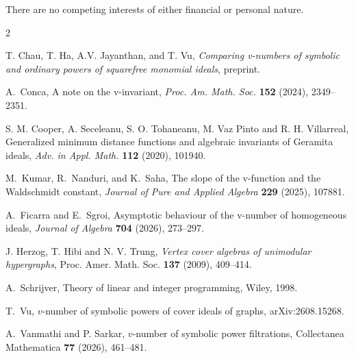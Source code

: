 \documentclass[12pt,amscd]{amsart}
\theoremstyle{definition}
\numberwithin{equation}{section}
\begin{document}
 There are no competing interests of either financial or personal nature.

\begin{thebibliography}{2}





 T. Chau, T. Ha, A.V. Jayanthan, and T. Vu, {\it Comparing v-numbers of symbolic and ordinary powers of squarefree monomial ideals},  preprint.

A.~Conca,
A note on the v-invariant, {\em Proc. Am. Math. Soc.} {\bf 152} (2024), 2349--2351.



S. M. Cooper, A. Seceleanu, S. O. Tohaneanu, M. Vaz Pinto and R. H. Villarreal, Generalized minimum distance functions and algebraic invariants of Geramita ideals,
{\em Adv. in Appl. Math.} {\bf 112} (2020), 101940.


M.~Kumar, R.~Nanduri, and K.~Saha,
The slope of the v-function and the Waldschmidt constant, {\em Journal of Pure and Applied Algebra} {\bf 229} (2025), 107881.



A.~Ficarra and E.~Sgroi,
Asymptotic behaviour of the v-number of homogeneous ideals, {\em Journal of Algebra} {\bf 704} (2026), 273--297.

 J. Herzog, T. Hibi and N. V. Trung, {\it Vertex cover algebras of unimodular hypergraphs}, Proc. Amer. Math. Soc. {\bf 137} (2009), 409--414.



A.~Schrijver, Theory of linear and integer programming, Wiley, 1998.

T.~Vu, $v$-number of symbolic powers of cover ideals of graphs, arXiv:2608.15268. 

A.~Vanmathi and P. Sarkar, $v$-number of symbolic power filtrations, Collectanea Mathematica {\bf 77} (2026), 461--481.


\end{thebibliography}
\end{document}
